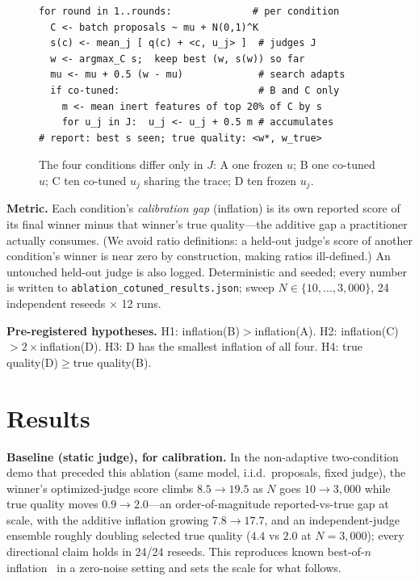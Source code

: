 \documentclass[sigconf]{acmart}
\begin{document}
\begin{figure}[t]
{\small
\begin{verbatim}
for round in 1..rounds:              # per condition
  C <- batch proposals ~ mu + N(0,1)^K
  s(c) <- mean_j [ q(c) + <c, u_j> ]  # judges J
  w <- argmax_C s;  keep best (w, s(w)) so far
  mu <- mu + 0.5 (w - mu)             # search adapts
  if co-tuned:                        # B and C only
    m <- mean inert features of top 20% of C by s
    for u_j in J:  u_j <- u_j + 0.5 m # accumulates
# report: best s seen; true quality: <w*, w_true>
\end{verbatim}}
\caption{The four conditions differ only in $J$: A one frozen $u$; B one co-tuned $u$; C ten co-tuned $u_j$ sharing the trace; D ten frozen $u_j$.}
\label{fig:algo}
\end{figure}

\textbf{Metric.} Each condition's \emph{calibration gap} (inflation) is its own reported score of its final winner minus that winner's true quality---the additive gap a practitioner actually consumes. (We avoid ratio definitions: a held-out judge's score of another condition's winner is near zero by construction, making ratios ill-defined.) An untouched held-out judge is also logged. Deterministic and seeded; every number is written to \texttt{ablation\_cotuned\_results.json}; sweep $N\in\{10,\dots,3{,}000\}$, 24 independent reseeds $\times$ 12 runs.

\textbf{Pre-registered hypotheses.} H1: inflation(B)$>$inflation(A). H2: inflation(C)$>2\times$inflation(D). H3: D has the smallest inflation of all four. H4: true quality(D)$\ge$true quality(B).

\section{Results}
\textbf{Baseline (static judge), for calibration.} In the non-adaptive two-condition demo that preceded this ablation (same model, i.i.d.\ proposals, fixed judge), the winner's optimized-judge score climbs $8.5\to19.5$ as $N$ goes $10\to3{,}000$ while true quality moves $0.9\to2.0$---an order-of-magnitude reported-vs-true gap at scale, with the additive inflation growing $7.8\to17.7$, and an independent-judge ensemble roughly doubling selected true quality ($4.4$ vs $2.0$ at $N{=}3{,}000$); every directional claim holds in 24/24 reseeds. This reproduces known best-of-$n$ inflation~\cite{gao2023} in a zero-noise setting and sets the scale for what follows.
\end{document}
